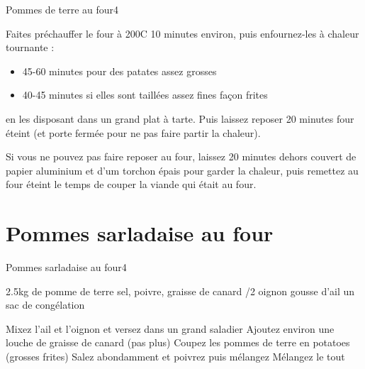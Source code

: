 {\begin{recette}{Pommes de terre au four}{4}{}{}
\begin{cuisson}
Faites préchauffer le four à 200\degres C 10 minutes environ, puis enfournez-les à chaleur tournante :
\begin{itemize}
\item 45-60 minutes pour des patates assez grosses
\item 40-45 minutes si elles sont taillées assez fines façon frites
\end{itemize}
en les disposant dans un grand plat à tarte. Puis laissez reposer 20 minutes four éteint (et porte fermée pour ne pas faire partir la chaleur). 
\begin{remarque}
Si vous ne pouvez pas faire reposer au four, laissez 20 minutes dehors couvert de papier aluminium et d'um torchon épais pour garder la chaleur, puis remettez au four éteint le temps de couper la viande qui était au four.
\end{remarque}





\end{cuisson}
\end{recette}


\section{Pommes sarladaise au four}
\begin{recette}{Pommes sarladaise au four}{4}{}{}
\begin{ingredients}
\ingredient 2.5kg de pomme de terre
\ingredient sel, poivre, graisse de canard
/2 oignon
 gousse d'ail
\ingredient un sac de congélation
\end{ingredients}

\begin{preparation}
\etape Mixez l'ail et l'oignon et versez dans un grand saladier
\etape Ajoutez environ une louche de graisse de canard (pas plus)
\etape Coupez les pommes de terre en potatoes (grosses frites)
\etape Salez abondamment et poivrez puis mélangez
\etape Mélangez le tout
\end{preparation}


\end{recette}}

